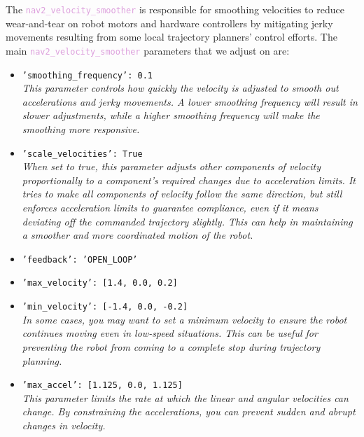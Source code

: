 The \textcolor{Plum}{\texttt{nav2\_velocity\_smoother}} is responsible for smoothing velocities to reduce wear-and-tear on robot motors and hardware controllers by mitigating jerky movements resulting from some local trajectory planners' control efforts. The main \textcolor{Plum}{\texttt{nav2\_velocity\_smoother}} parameters that we adjust on are:
\begin{itemize}
    \item \texttt{\textcolor{OliveGreen}{'smoothing\_frequency'}: \textcolor{NavyBlue}{0.1}}\\
    \textit{This parameter controls how quickly the velocity is adjusted to smooth out accelerations and jerky movements. A lower smoothing frequency will result in slower adjustments, while a higher smoothing frequency will make the smoothing more responsive.}
    
    \item \texttt{\textcolor{OliveGreen}{'scale\_velocities'}: \textcolor{NavyBlue}{True}}\\
    \textit{When set to true, this parameter adjusts other components of velocity proportionally to a component’s required changes due to acceleration limits. It tries to make all components of velocity follow the same direction, but still enforces acceleration limits to guarantee compliance, even if it means deviating off the commanded trajectory slightly. This can help in maintaining a smoother and more coordinated motion of the robot.}
    
    \item \texttt{\textcolor{OliveGreen}{'feedback'}: \textcolor{OliveGreen}{'OPEN\_LOOP'}}
    
    \item \texttt{\textcolor{OliveGreen}{'max\_velocity'}: [\textcolor{OliveGreen}{1.4, 0.0, 0.2}]}
    
    \item \texttt{\textcolor{OliveGreen}{'min\_velocity'}: [\textcolor{OliveGreen}{-1.4, 0.0, -0.2}]}\\
    \textit{In some cases, you may want to set a minimum velocity to ensure the robot continues moving even in low-speed situations. This can be useful for preventing the robot from coming to a complete stop during trajectory planning.}
    
    \item \texttt{\textcolor{OliveGreen}{'max\_accel'}: [\textcolor{OliveGreen}{1.125, 0.0, 1.125}]}\\
    \textit{This parameter limits the rate at which the linear and angular velocities can change. By constraining the accelerations, you can prevent sudden and abrupt changes in velocity.}
    

\end{itemize}
